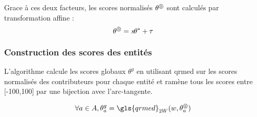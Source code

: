 Grace à ces deux facteurs, les scores normalisés $\theta^\circledS$ sont calculés par transformation affine :
\begin{equation}
\theta^\circledS=\textit{s}\theta^* + \tau
\end{equation}


\subsubsection{Construction des scores des entités}

L'algorithme calcule les scores globaux $\theta^g$ en utilisant \gls{qrmed} sur les scores normalisés des contributeurs pour chaque entité et ramène tous les scores entre [-100,100] par une bijection avec l'arc-tangente.

\begin{equation}
    \forall a \in A , \theta^g_a=\gls{qrmed}_{2W}(w,\theta^\circledS_a)
\end{equation}


\pagebreak

